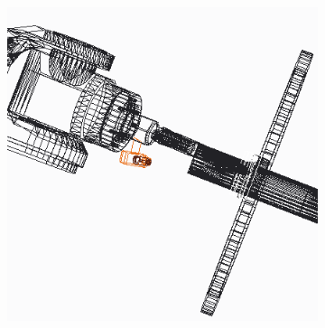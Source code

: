 \begin{figure}
\begin{subfigure}[b]{0.5\textwidth}
\end{subfigure}
\begin{subfigure}[b]{0.3\textwidth}
\includegraphics[width=\textwidth]{graphics/CAD3}
\end{subfigure}
\end{figure}

